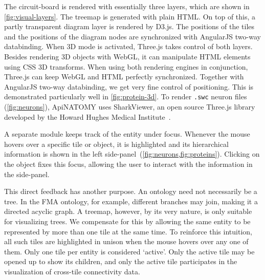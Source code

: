 
The circuit-board is rendered with essentially three layers,
which are shown in \cref{fig:visual-layers}. The treemap is generated
with plain HTML. On top of this, a partly transparent diagram layer is
rendered by D3.js. The positions of the tiles and the positions of the
diagram nodes are synchronized with AngularJS two-way databinding.
When 3D mode is activated, Three.js takes control of both layers.
Besides rendering 3D objects with WebGL, it can manipulate HTML
elements using CSS 3D transforms. When using both rendering engines
in conjunction, Three.js can keep WebGL and HTML perfectly synchronized.
Together with AngularJS two-way databinding, we get very fine control
of positioning. This is demonstrated particularly well in \cref{fig:protein-3d}.
To render \texttt{.swc} neuron files (\cref{fig:neurons}), ApiNATOMY uses SharkViewer,
an open source Three.js library
developed by the Howard Hughes Medical Institute~\cite{weaver_sharkviewer_2014}.


A separate module keeps track of the entity under focus. Whenever the mouse hovers
over a specific tile or object, it is highlighted and its hierarchical information
is shown in the left side-panel~(\cref{fig:neurons,fig:proteins}). Clicking on the object
fixes this focus, allowing the user to interact with the information in the side-panel.

This direct feedback has another purpose. An ontology need not necessarily be a
tree. In the FMA ontology, for example, different branches may join, making it a
directed acyclic graph. A treemap, however, by its very nature, is only suitable
for visualizing trees. We compensate for this by allowing the same entity to be
represented by more than one tile at the same time. To reinforce this intuition, all
such tiles are highlighted in unison when the mouse hovers over any one of them.
Only one tile per entity is considered `active'. Only the active tile may be opened
up to show its children, and only the active tile participates in the visualization
of cross-tile connectivity data.

